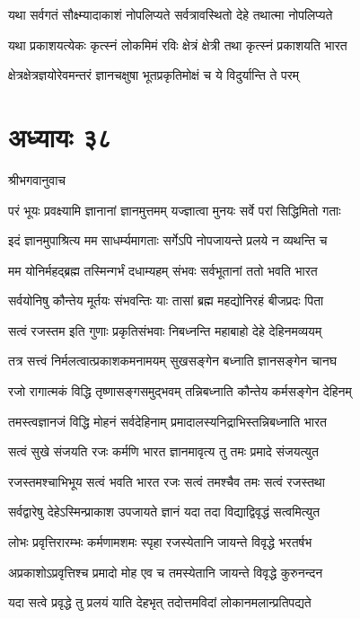 \twolineshloka
{यथा सर्वगतं सौक्ष्म्यादाकाशं नोपलिप्यते}
{सर्वत्रावस्थितो देहे तथात्मा नोपलिप्यते}


\twolineshloka
{यथा प्रकाशयत्येकः कृत्स्नं लोकमिमं रविः}
{क्षेत्रं क्षेत्री तथा कृत्स्नं प्रकाशयति भारत}


\twolineshloka
{क्षेत्रक्षेत्रज्ञयोरेवमन्तरं ज्ञानचक्षुषा}
{भूतप्रकृतिमोक्षं च ये विदुर्यान्ति ते परम्}


\chapter{अध्यायः ३८}
\twolineshloka
{श्रीभगवानुवाच}
{}


\twolineshloka
{परं भूयः प्रवक्ष्यामि ज्ञानानां ज्ञानमुत्तमम्}
{यज्ज्ञात्वा मुनयः सर्वे परां सिद्धिमितो गताः}


\twolineshloka
{इदं ज्ञानमुपाश्रित्य मम साधर्म्यमागताः}
{सर्गेऽपि नोपजायन्ते प्रलये न व्यथन्ति च}


\twolineshloka
{मम योनिर्महद्ब्रह्म तस्मिन्गर्भं दधाम्यहम्}
{संभवः सर्वभूतानां ततो भवति भारत}


\twolineshloka
{सर्वयोनिषु कौन्तेय मूर्तयः संभवन्तिः याः}
{तासां ब्रह्म महद्योनिरहं बीजप्रदः पिता}


\twolineshloka
{सत्वं रजस्तम इति गुणाः प्रकृतिसंभवाः}
{निबध्नन्ति महाबाहो देहे देहिनमव्ययम्}


\twolineshloka
{तत्र सत्त्वं निर्मलत्वात्प्रकाशकमनामयम्}
{सुखसङ्गेन बध्नाति ज्ञानसङ्गेन चानघ}


\twolineshloka
{रजो रागात्मकं विद्धि तृष्णासङ्गसमुद्भवम्}
{तन्निबध्नाति कौन्तेय कर्मसङ्गेन देहिनम्}


\twolineshloka
{तमस्त्वज्ञानजं विद्धि मोहनं सर्वदेहिनाम्}
{प्रमादालस्यनिद्राभिस्तन्निबध्नाति भारत}


\twolineshloka
{सत्वं सुखे संजयति रजः कर्मणि भारत}
{ज्ञानमावृत्य तु तमः प्रमादे संजयत्युत}


\twolineshloka
{रजस्तमश्चाभिभूय सत्वं भवति भारत}
{रजः सत्वं तमश्चैव तमः सत्वं रजस्तथा}


\twolineshloka
{सर्वद्वारेषु देहेऽस्मिन्प्राकाश उपजायते}
{ज्ञानं यदा तदा विद्याद्विवृद्धं सत्वमित्युत}


\twolineshloka
{लोभः प्रवृत्तिरारम्भः कर्मणामशमः स्पृहा}
{रजस्येतानि जायन्ते विवृद्धे भरतर्षभ}


\twolineshloka
{अप्रकाशोऽप्रवृत्तिश्च प्रमादो मोह एव च}
{तमस्येतानि जायन्ते विवृद्धे कुरुनन्दन}


\twolineshloka
{यदा सत्वे प्रवृद्धे तु प्रलयं याति देहभृत्}
{तदोत्तमविदां लोकानमलान्प्रतिपद्यते}


